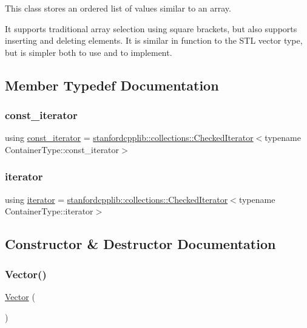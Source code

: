 This class stores an ordered list of values similar to an array. 

It supports traditional array selection using square brackets, but also supports inserting and deleting elements. It is similar in function to the S\+TL {\ttfamily vector} type, but is simpler both to use and to implement. 

\subsection{Member Typedef Documentation}
\mbox{\label{classVector_aa1fbc80673e1a5d9661a77e20836b8d8}} 
\subsubsection{\texorpdfstring{const\+\_\+iterator}{const\_iterator}}
{\footnotesize\ttfamily using \mbox{\hyperlink{classVector_aa1fbc80673e1a5d9661a77e20836b8d8}{const\+\_\+iterator}} =  \mbox{\hyperlink{classstanfordcpplib_1_1collections_1_1CheckedIterator}{stanfordcpplib\+::collections\+::\+Checked\+Iterator}}$<$typename Container\+Type\+::const\+\_\+iterator$>$}

\mbox{\label{classVector_aa8cbadd6807ea71ae7465ef4793a6866}} 
\subsubsection{\texorpdfstring{iterator}{iterator}}
{\footnotesize\ttfamily using \mbox{\hyperlink{classVector_aa8cbadd6807ea71ae7465ef4793a6866}{iterator}} =  \mbox{\hyperlink{classstanfordcpplib_1_1collections_1_1CheckedIterator}{stanfordcpplib\+::collections\+::\+Checked\+Iterator}}$<$typename Container\+Type\+::iterator$>$}



\subsection{Constructor \& Destructor Documentation}
\mbox{\label{classVector_aba83f7828d95b601500471996fc8c3c0}} 
\subsubsection{\texorpdfstring{Vector()}{Vector()}\hspace{0.1cm}{\footnotesize\ttfamily [1/3]}}
{\footnotesize\ttfamily \mbox{\hyperlink{classVector}{Vector}} (\begin{DoxyParamCaption}{ }\end{DoxyParamCaption})\hspace{0.3cm}{\ttfamily [default]}}



